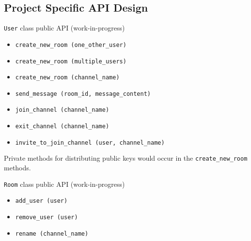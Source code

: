 \documentclass[letterpaper, 10 pt, conference]{ieeeconf}  %
\begin{document}
\subsection{Project Specific API Design}

\verb|User| class public API (work-in-progress)
\begin{itemize}
\item \begin{verbatim}create_new_room (one_other_user)\end{verbatim} 
\item \begin{verbatim}create_new_room (multiple_users)\end{verbatim} 
\item \begin{verbatim}create_new_room (channel_name)\end{verbatim}
\item \begin{verbatim}send_message (room_id, message_content)\end{verbatim}
\item \begin{verbatim}join_channel (channel_name)\end{verbatim}
\item \begin{verbatim}exit_channel (channel_name)\end{verbatim}
\item \begin{verbatim}invite_to_join_channel (user, channel_name)\end{verbatim}
\end{itemize}

Private methods for distributing public keys would occur in the \verb|create_new_room| methods. 

\verb|Room| class public API (work-in-progress)
\begin{itemize}
\item \begin{verbatim}add_user (user)\end{verbatim} 
\item \begin{verbatim}remove_user (user)\end{verbatim} 
\item \begin{verbatim}rename (channel_name)\end{verbatim}
\end{itemize}
\end{document}
